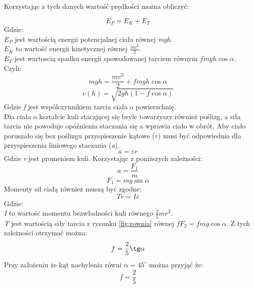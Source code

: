 Korzystając z tych danych wartość prędkości można obliczyć:

\begin{equation}
E_{P} = E_{K} + E_{T}
\end{equation}
Gdzie:\\
$ E_{P} $ jest wartością energii potencjalnej ciała równej \emph{mgh}.\\
$ E_{K} $ to wartość energii kinetycznej równej $ \frac{mv^{2}}{2} $.\\
$ E_{T} $ jest wartoscią spadku energii spowodowanej tarciem równym $ fmgh \cos
\alpha $.\\
Czyli:\\
\begin{equation}
mgh = \frac{mv^{2}}{2} + fmgh \cos \alpha
\end{equation}
\begin{equation}
\label{eq:boxVelocity}
v(h) = \sqrt{2gh(1-f \cos \alpha)}
\end{equation}
Gdzie \emph{f} jest wspólczynnikiem tarcia ciała o powierzchnię.\\
Dla ciała o kształcie kuli staczjącej się bryle towarzyszy również poślizg, a
siła tarcia nie powoduje opóźnienia staczania się a wprawia ciało w obrót. Aby
ciało poruszało się bez poślizgu przyspieszenie kątowe ($ \varepsilon $) musi
być odpowiednia dla przyspieszenia liniowego staczania (\emph{a}).
\begin{equation}
a = \varepsilon r
\end{equation}
Gdzie \emph{r} jest promeniem kuli. Korzystając z poniższych zależności:
\begin{equation}
a = \frac{F_{1}}{m}
\end{equation}
\begin{equation}
F_{1} = mg \sin \alpha
\end{equation}
Momenty sił ciałą również muszą być zgodne:
\begin{equation}
Tr = I \varepsilon
\end{equation}
Gdzie:\\
\emph{I} to wartość momentu bezwładności kuli równego $ \frac{2}{5}mr^{2} $.\\
\emph{T} jest wartością siły tarcia z rysunku \ref{fig:rownia} równej $ fF_{2}
= fmg \cos \alpha $.
Z tych zależności otrzymać można:
\begin{equation}
f = \frac{2}{5} \tg \alpha
\end{equation}
Przy założeniu że kąt nachylenia równi $ \alpha = 45^{\circ} $ można przyjąć
że:
\begin{equation}
f = \frac{2}{5}
\label{eq:friction}
\end{equation}

